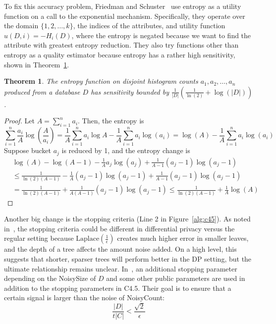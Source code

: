 \documentclass[11pt]{report}
\newtheorem{theorem}{Theorem}
\begin{document}
To fix this accuracy problem, Friedman and Schuster~\cite{Friedman:2010} use entropy as a utility function on a call to the exponential mechanism. Specifically, they operate over the domain $\{1,2,\ldots, k\}$, the indices of the attributes, and utility function $u(D, i) = -H_i(D)$, where the entropy is negated because we want to find the attribute with greatest entropy reduction. They also try functions other than entropy as a quality estimator because entropy has a rather high sensitivity, shown in Theorem~\ref{thm:ent_sens}.

\begin{theorem}\label{thm:ent_sens}
The entropy function on disjoint histogram counts $a_1,a_2,\ldots, a_n$ produced from a database $D$ has sensitivity bounded by $\frac{1}{|D|}\left(\frac{1}{\ln(2)} + \log(|D|) \right)$.
\end{theorem}
\begin{proof}
Let $A = \sum_{i=1}^n a_i$. Then, the entropy is 
\[
\sum_{i=1}^n \frac{a_i}{A}\log\left(\frac{A}{a_i}\right) = \frac{1}{A}\sum_{i=1}^n a_i\log A - \frac{1}{A} \sum_{i=1}^n a_i\log(a_i) = \log(A) - \frac{1}{A}\sum_{i=1}^n a_i\log(a_i)
\]
Suppose bucket $a_j$ is reduced by 1, and the entropy change is
\begin{align*}
&\log(A) - \log(A-1) - \frac{1}{A} a_j\log(a_j) + \frac{1}{A-1} (a_j-1)\log(a_j-1) \\
&\leq \frac{1}{\ln(2)(A-1)} -\frac{1}{A}(a_j-1)\log(a_j-1) + \frac{1}{A-1}(a_j-1)\log(a_j-1) \\
&= \frac{1}{\ln(2)(A-1)}+\frac{1}{A(A-1)}(a_j-1)\log(a_j-1) \leq \frac{1}{\ln(2)(A-1)} + \frac{1}{A}\log(A)
\end{align*}
\end{proof}
Another big change is the stopping criteria (Line 2 in Figure~\ref{alg:c45}). As noted in~\cite{Fletcher:2016}, the stopping criteria could be different in differential privacy versus the regular setting because $\text{Laplace}\left(\frac{1}{\epsilon}\right)$ creates much higher error in smaller leaves, and the depth of a tree affects the amount noise added. On a high level, this suggests that shorter, sparser trees will perform better in the DP setting, but the ultimate relationship remains unclear. In~\cite{Friedman:2010}, an additional stopping parameter depending on the NoisySize of $D$ and some other public parameters are used in addition to the stopping parameters in C4.5. Their goal is to ensure that a certain signal is larger than the noise of NoisyCount:
\[
\frac{|D|}{t|C|} < \frac{\sqrt{2}}{\epsilon}
\]
\end{document}
